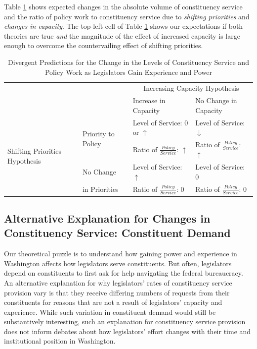 \documentclass[12pt]{article}
\begin{document}
Table \ref{t:theory} shows expected changes in the absolute volume of constituency service and the ratio of policy work to constituency service due to \textit{shifting priorities} and \textit{changes in capacity}. The top-left cell of Table \ref{t:theory} shows our expectations if both theories are true \textit{and} the magnitude of the effect of increased capacity is large enough to overcome the countervailing effect of shifting priorities.

\begin{table}[]
\caption{Divergent Predictions for the Change in the Levels of Constituency Service and Policy Work as Legislators Gain Experience and Power}\label{t:theory}

\begin{tabular}{p{.15\linewidth}|p{.20\linewidth}|p{.32\linewidth}|p{.33\linewidth}|}
\hline
\multicolumn{2}{l}{\multirow{2}{*}{}} & \multicolumn{2}{|c|}{Increasing Capacity Hypothesis} \\ \cline{3-4}
\multicolumn{2}{l|}{}    &  Increase in Capacity  &   No Change in Capacity \\ \cline{1-4} 
\multirow{4}{1.8cm}{Shifting Priorities Hypothesis}  &   \multirow{2}{2cm}{Priority to Policy}   &  Level of Service: 0 or $\uparrow$  &  Level of Service: $\downarrow$  \\ 
& &  Ratio of $\frac{Policy}{Service}$: $\uparrow$   &   Ratio of $\frac{Policy}{Service}$: $\uparrow$  \\ \cline{2-4}
 &  No Change    &  Level of Service: $\uparrow$  & Level of Service: $0$ \\ 
 & in Priorities &   Ratio of $\frac{Policy}{Service}$: $0$  & Ratio of $\frac{Policy}{Service}$: $0$\\ \hline
\end{tabular}
\end{table}



\subsection{Alternative Explanation for Changes in Constituency Service: Constituent Demand}

Our theoretical puzzle is to understand how gaining power and experience in Washington affects how legislators serve constituents. But often, legislators depend on constituents to first ask for help navigating the federal bureaucracy. An alternative explanation for why legislators' rates of constituency service provision vary is that they receive differing numbers of requests from their constituents for reasons that are not a result of legislators' capacity and experience. While such variation in constituent demand would still be substantively interesting, such an explanation for constituency service provision does not inform debates about how legislators' effort changes with their time and institutional position in Washington. 
\end{document}
